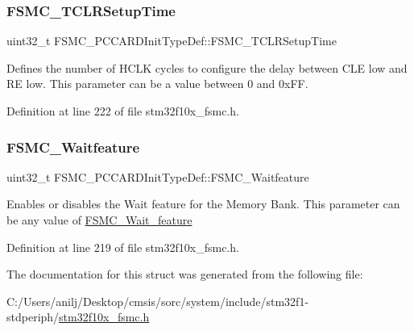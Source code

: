 \subsubsection{\texorpdfstring{F\+S\+M\+C\+\_\+\+T\+C\+L\+R\+Setup\+Time}{FSMC\_TCLRSetupTime}}
{\footnotesize\ttfamily uint32\+\_\+t F\+S\+M\+C\+\_\+\+P\+C\+C\+A\+R\+D\+Init\+Type\+Def\+::\+F\+S\+M\+C\+\_\+\+T\+C\+L\+R\+Setup\+Time}

Defines the number of H\+C\+LK cycles to configure the delay between C\+LE low and RE low. This parameter can be a value between 0 and 0x\+FF. 

Definition at line 222 of file stm32f10x\+\_\+fsmc.\+h.

\mbox{\label{struct_f_s_m_c___p_c_c_a_r_d_init_type_def_a3ffd8c627ffe3ac90dfbfe93a8b97c26}} 
\subsubsection{\texorpdfstring{F\+S\+M\+C\+\_\+\+Waitfeature}{FSMC\_Waitfeature}}
{\footnotesize\ttfamily uint32\+\_\+t F\+S\+M\+C\+\_\+\+P\+C\+C\+A\+R\+D\+Init\+Type\+Def\+::\+F\+S\+M\+C\+\_\+\+Waitfeature}

Enables or disables the Wait feature for the Memory Bank. This parameter can be any value of \hyperlink{group___f_s_m_c___wait__feature}{F\+S\+M\+C\+\_\+\+Wait\+\_\+feature} 

Definition at line 219 of file stm32f10x\+\_\+fsmc.\+h.



The documentation for this struct was generated from the following file\+:\begin{DoxyCompactItemize}
\item 
C\+:/\+Users/anilj/\+Desktop/cmsis/sorc/system/include/stm32f1-\/stdperiph/\hyperlink{stm32f10x__fsmc_8h}{stm32f10x\+\_\+fsmc.\+h}\end{DoxyCompactItemize}

